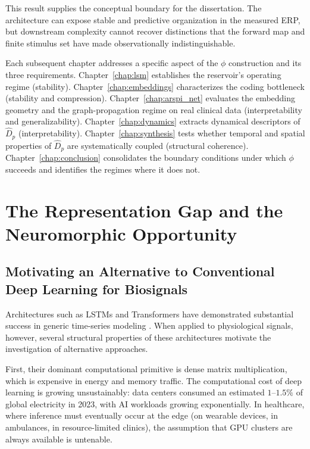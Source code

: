 This result supplies the conceptual boundary for the dissertation. The
architecture can expose stable and predictive organization in the measured ERP,
but downstream complexity cannot recover distinctions that the forward map and
finite stimulus set have made observationally indistinguishable.

Each subsequent chapter addresses a specific aspect of the $\phi$ construction and its three requirements. Chapter~\ref{chap:lsm} establishes the reservoir's operating regime (stability). Chapter~\ref{chap:embeddings} characterizes the coding bottleneck (stability and compression). Chapter~\ref{chap:arspi_net} evaluates the embedding geometry and the graph-propagation regime on real clinical data (interpretability and generalizability). Chapter~\ref{chap:dynamics} extracts dynamical descriptors of $\hat{D}_p$ (interpretability). Chapter~\ref{chap:synthesis} tests whether temporal and spatial properties of $\hat{D}_p$ are systematically coupled (structural coherence). Chapter~\ref{chap:conclusion} consolidates the boundary conditions under which $\phi$ succeeds and identifies the regimes where it does not.


\section{The Representation Gap and the Neuromorphic Opportunity}

\subsection{Motivating an Alternative to Conventional Deep Learning for Biosignals}

Architectures such as LSTMs and Transformers have demonstrated substantial success in generic time-series modeling \cite{ismail_fawaz_deep_2019}. When applied to physiological signals, however, several structural properties of these architectures motivate the investigation of alternative approaches.

First, their dominant computational primitive is dense matrix multiplication, which is expensive in energy and memory traffic. The computational cost of deep learning is growing unsustainably: data centers consumed an estimated $1$--$1.5\%$ of global electricity in 2023, with AI workloads growing exponentially. In healthcare, where inference must eventually occur at the edge (on wearable devices, in ambulances, in resource-limited clinics), the assumption that GPU clusters are always available is untenable.

